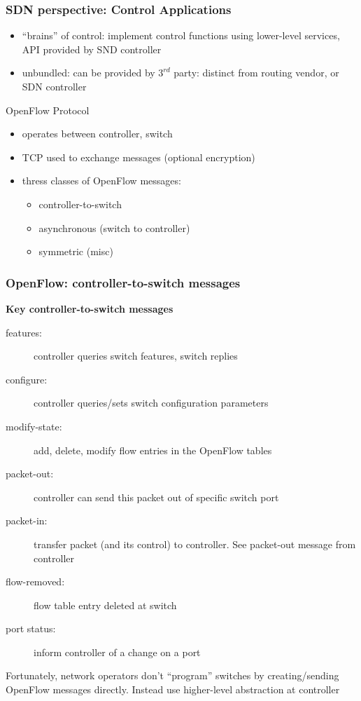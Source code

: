 \subsubsection{SDN perspective: Control Applications}
\begin{itemize}
	\item ``brains'' of control: implement control functions using lower-level services, API provided by SND controller
	\item unbundled: can be provided by $3^{rd}$ party: distinct from routing vendor, or SDN controller
\end{itemize}
\begin{note}{OpenFlow Protocol}
	\begin{itemize}
		\item operates between controller, switch
		\item TCP used to exchange messages (optional encryption)
		\item thress classes of OpenFlow messages:
		\begin{itemize}
			\item controller-to-switch
			\item asynchronous (switch to controller)
			\item symmetric (misc)
		\end{itemize}
	\end{itemize}
\end{note}
\subsubsection{OpenFlow: controller-to-switch messages}
\textbf{Key controller-to-switch messages}
\begin{description}
	\item[features:] controller queries switch features, switch replies
	\item[configure:] controller queries/sets switch configuration parameters
	\item[modify-state:] add, delete, modify flow entries in the OpenFlow tables
	\item[packet-out:] controller can send this packet out of specific switch port
	\item[packet-in:] transfer packet (and its control) to controller. See packet-out message from controller
	\item[flow-removed:] flow table entry deleted at switch
	\item[port status:] inform controller of a change on a port
\end{description}
\begin{leftbar}
	Fortunately, network operators don't ``program'' switches by creating/sending OpenFlow messages directly. Instead use higher-level abstraction at controller
\end{leftbar}
